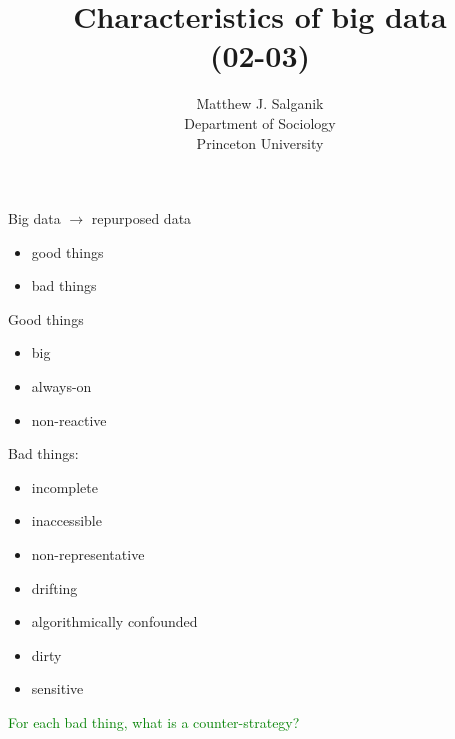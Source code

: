 \documentclass[aspectratio=169]{beamer}
\title[]{Characteristics of big data\\(02-03)}
\author[]{Matthew J. Salganik\\Department of Sociology\\Princeton University}
\date[]{Soc 596: Computational Social Science\\Fall 2016
\vfill
\begin{flushright}
\vspace{0.6in}
\texttt{[image: figures/cc.png]}
\end{flushright}
}
\def\vf{\vfill}
\begin{document}
\frame{\titlepage}
\begin{frame}

Big data $\rightarrow$ repurposed data
\begin{itemize}
\item good things
\item bad things
\end{itemize}

\end{frame}
\begin{frame}

Good things
\begin{itemize}
\item big 
\pause
\item always-on
\pause
\item non-reactive 
\end{itemize}

\end{frame}
\begin{frame}

Bad things:
\begin{itemize}
\item incomplete
\pause
\item inaccessible
\pause
\item non-representative
\pause
\item drifting
\pause
\item algorithmically confounded
\pause
\item dirty
\pause
\item sensitive 
\end{itemize}
\vf
\pause
\textcolor{green}{For each bad thing, what is a counter-strategy?}

\end{frame}
\end{document}
